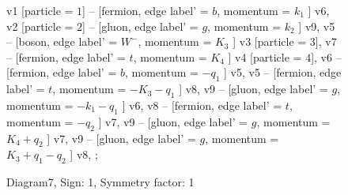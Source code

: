 \documentclass{revtex4}
\begin{document}
\begin{figure}[!htb]
\begin{center}
{    %
v1 [particle = \(1\)] -- [fermion, edge label' = \(b\), momentum = \(k_{1}\) ] v6, 
v2 [particle = \(2\)] -- [gluon, edge label' = \(g\), momentum = \(k_{2}\) ] v9, 
v5 -- [boson, edge label' = \(W^{-}\), momentum = \(K_{3}\) ] v3 [particle = \(3\)], 
v7 -- [fermion, edge label' = \(t\), momentum = \(K_{4}\) ] v4 [particle = \(4\)], 
v6 -- [fermion, edge label' = \(b\), momentum = \(-q_{1}\) ] v5, 
v5 -- [fermion, edge label' = \(t\), momentum = \(-K_{3} - q_{1}\) ] v8, 
v9 -- [gluon, edge label' = \(g\), momentum = \(-k_{1} - q_{1}\) ] v6, 
v8 -- [fermion, edge label' = \(t\), momentum = \(-q_{2}\) ] v7, 
v9 -- [gluon, edge label' = \(g\), momentum = \(K_{4} + q_{2}\) ] v7, 
v9 -- [gluon, edge label' = \(g\), momentum = \(K_{3} + q_{1} - q_{2}\) ] v8, 
};
\end{center}
\caption{Diagram7, Sign: 1, Symmetry factor: 1}
\end{figure}
\newpage
\end{document}
